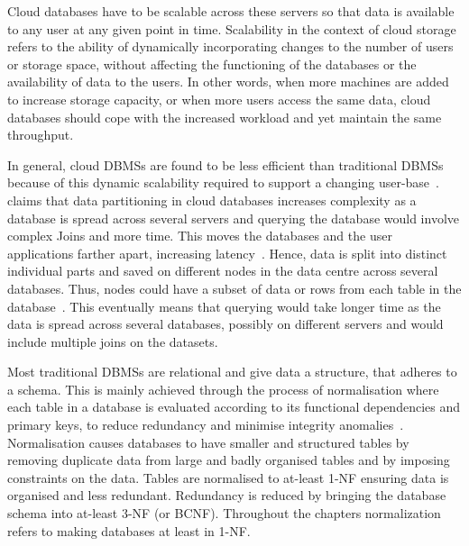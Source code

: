 Cloud databases have to be scalable across these servers so that data is
available to any user at any given point in time.  Scalability in the context of
cloud storage refers to the ability of dynamically incorporating changes to the
number of users or storage space,   without affecting the functioning of the
databases or the availability of data to the users.  In other words,   when more
machines are added to increase storage capacity,   or when more users access the
same data,   cloud databases should cope with the increased workload and yet
maintain the same throughput.

In general,   cloud \acp{DBMS} are found to be less efficient than traditional
\acp{DBMS} because of this dynamic scalability required to support a changing
user-base~\citep{Hogan,Stonebraker,Abadi}. \citet{Hogan} claims that data
partitioning in cloud databases increases complexity as a database is spread
across several servers and querying the database would involve complex Joins and
more time.  This moves the databases and the user applications farther apart,
increasing latency~\citep{Murphy}. Hence,   data is split into distinct
individual parts and saved on different nodes in the data centre across several
databases. Thus,   nodes could have a subset of data or rows from each table in
the database~\citep{dewitt}. This eventually means that querying would take
longer time as the data is spread across several databases, possibly on
different servers and would include multiple joins on the datasets.

Most traditional \acp{DBMS} are relational and give data a structure,   that
adheres to a schema.  This is mainly achieved through the process of
normalisation where each table in a database is evaluated according to its
functional dependencies and primary keys,   to reduce redundancy and minimise
integrity anomalies~\citep{Navathe}.  Normalisation causes databases to have
smaller and structured tables by removing duplicate data from large and badly
organised tables and by imposing constraints on the data.  Tables are normalised
to at-least \ac{1-NF} ensuring data is organised and less redundant.
Redundancy is reduced by bringing the database schema into at-least \ac{3-NF}
(or \ac{BCNF}). Throughout the chapters normalization refers to making databases
at least in \ac{1-NF}.

